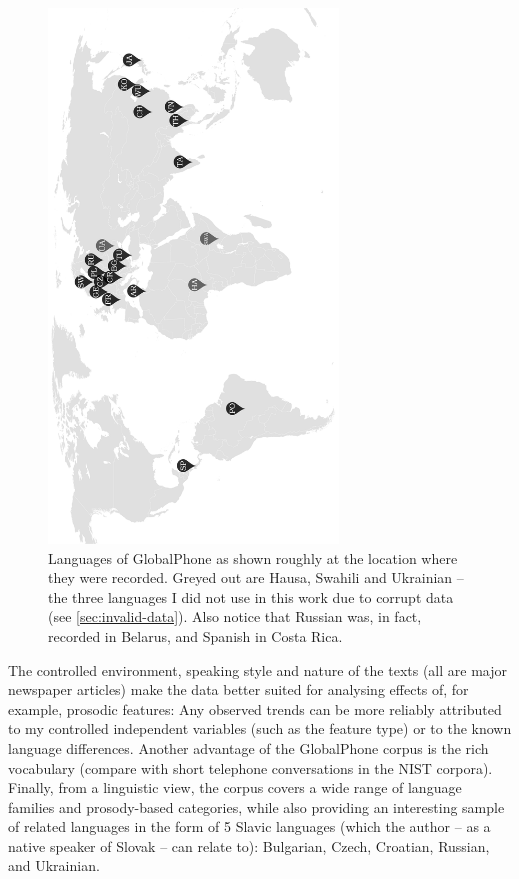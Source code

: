 \documentclass[bsc,frontabs,twoside,singlespacing,parskip,deptreport]{infthesis}
\begin{document}
{{    \begin{figure}[h!t]
      \centering
      \includegraphics[width=7.7cm, angle=270]{graphics/GlobalPhone-map.pdf}
      \vspace*{-1em}
      \caption{Languages of GlobalPhone as shown roughly at the location where they were recorded. Greyed out are Hausa, Swahili and Ukrainian -- the three languages I did not use in this work due to corrupt data (see \autoref{sec:invalid-data}). Also notice that Russian was, in fact, recorded in Belarus, and Spanish in Costa Rica.}
      \label{fig:GlobalPhone-map}
    \end{figure}
    
    The controlled environment, speaking style and nature of the texts (all are major newspaper articles) make the data better suited for analysing effects of, for example, prosodic features: Any observed trends can be more reliably attributed to my controlled independent variables (such as the feature type) or to the known language differences.
    Another advantage of the GlobalPhone corpus is the rich vocabulary (compare with short telephone conversations in the NIST corpora).
    Finally, from a linguistic view, the corpus covers a wide range of language families and prosody-based categories, while also providing an interesting sample of related languages in the form of 5 Slavic languages (which the author -- as a native speaker of Slovak -- can relate to): Bulgarian, Czech, Croatian, Russian, and Ukrainian.

}}
\end{document}
